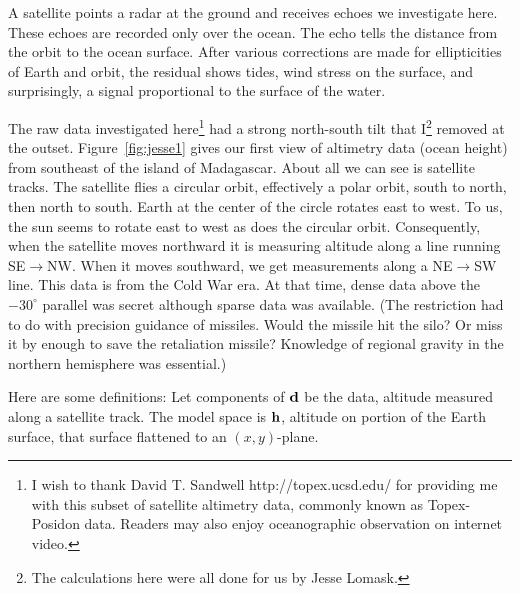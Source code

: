 \par
A satellite points a radar at the ground and
receives echoes we investigate here.
These echoes are recorded only over the ocean.
The echo tells the distance from the orbit to the ocean surface.
After various corrections are made for ellipticities of Earth and orbit,
the residual shows tides, wind stress on the surface,
and surprisingly, a signal proportional to the surface of the water.
\par
The raw data investigated here\footnote{
	I wish to thank David T. Sandwell
	http://topex.ucsd.edu/
	for providing me with this subset of satellite altimetry data,
	commonly known as Topex-Posidon data.
	Readers may also enjoy oceanographic observation
	on internet video.
	}
had a strong north-south tilt that
I\footnote{
	The calculations here were
	all done for us by Jesse Lomask.
	}
removed at the outset.
Figure~\ref{fig:jesse1} gives our first view of altimetry data
(ocean height) from southeast of the island of
Madagascar.
About all we can see is satellite tracks.
The satellite flies a circular orbit, effectively a polar orbit,
south to north, then north to south.
Earth at the center of the circle rotates east to west.
To us,
the sun seems to rotate east to west
as does the circular orbit.
Consequently, when the satellite moves northward
it is measuring altitude along a line running SE$\rightarrow$NW.
When it moves southward,
we get measurements along a NE$\rightarrow$SW line.
This data is from the Cold War era.
At that time,
dense data above the $-30^\circ$ parallel was secret
although sparse data was available.
(The restriction had to do with precision guidance of missiles.
Would the missile hit the silo?
Or miss it by enough to save the retaliation missile?
Knowledge of regional gravity in the northern hemisphere was essential.)
\par
Here are some definitions:
Let components of $\bold d$ be the data,
altitude measured along a satellite track.
The model space is $\bold h$, altitude on portion of the Earth surface,
that surface flattened to an $(x,y)$-plane.
